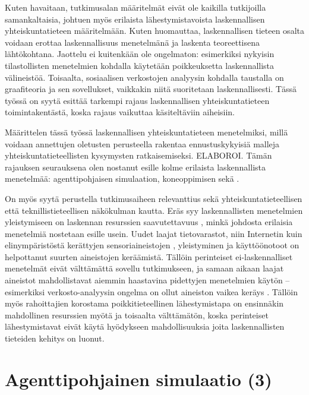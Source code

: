 \documentclass[finnish,gradu,twoside,12pt]{tktltiki}
\begin{document}
Kuten havaitaan, tutkimusalan määritelmät eivät ole kaikilla tutkijoilla samankaltaisia, johtuen myös erilaista lähestymistavoista laskennallisen yhteiskuntatieteen määritelmään. Kuten \citet{cioffi-revilla10} huomauttaa, laskennallisen tieteen osalta voidaan erottaa laskennallisuus menetelmänä ja laskenta teoreettisena lähtökohtana. Jaottelu ei kuitenkään ole ongelmaton: esimerkiksi nykyisin tilastollisten menetelmien kohdalla käytetään poikkeuksetta laskennallista välineistöä. Toisaalta, sosiaalisen verkostojen analyysin kohdalla taustalla on graafiteoria ja sen sovellukset, vaikkakin niitä suoritetaan laskennallisesti. Tässä työssä on syytä esittää tarkempi rajaus laskennallisen yhteiskuntatieteen toimintakentästä, koska rajaus vaikuttaa käsiteltäviin aiheisiin.

\label{css-maar}

Määrittelen tässä työssä laskennallisen yhteiskuntatieteen menetelmiksi, millä voidaan annettujen oletusten perusteella rakentaa ennustuskykyisiä malleja yhteiskuntatieteellisten kysymysten ratkaisemiseksi. ELABOROI. Tämän rajauksen seurauksena olen nostanut esille kolme erilaista laskennallista menetelmää: agenttipohjaisen simulaation, koneoppimisen sekä .

On myös syytä perustella tutkimusaiheen relevanttius sekä yhteiskuntatieteellisen että teknillistieteellisen näkökulman kautta. Eräs syy laskennallisten menetelmien yleistymiseen on laskennan resurssien saavutettavuus \cite{z,x}, minkä johdosta erilaisia menetelmiä nostetaan esille usein. Uudet laajat tietovarastot, niin Internetin \citep{adamic05,notess02} kuin elinympäristöstä kerättyjen sensoriaineistojen \citep{eagle06,oulasvirta12}, yleistyminen ja käyttöönotoot on helpottanut suurten aineistojen keräämistä. Tällöin perinteiset ei-laskennalliset menetelmät eivät välttämättä sovellu tutkimukseen, ja samaan aikaan laajat aineistot mahdollistavat aiemmin haastavina pidettyjen menetelmien käytön -- esimerkiksi verkosto-analyysin ongelma on ollut aineiston vaikea keräys \citep{a}. Tällöin myös rahoittajien korostama poikkitieteellinen lähestymistapa \citep[60]{tieteentila12} on ensinnäkin mahdollinen resurssien myötä ja toisaalta välttämätön, koska perinteiset lähestymistavat eivät käytä hyödykseen mahdollisuuksia joita laskennallisten tieteiden kehitys on luonut.

\newpage

\section{Agenttipohjainen simulaatio (3)}
\end{document}
